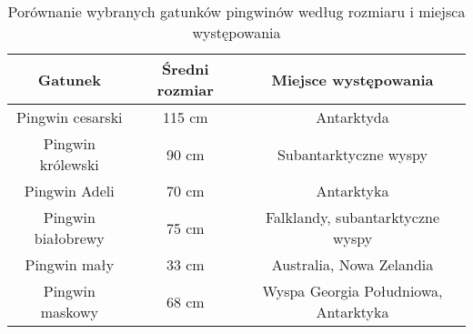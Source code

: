 
\begin{table}[h!]
    \centering
    \begin{tabular}{|c|c|c|}
        \hline
        \textbf{Gatunek} & \textbf{Średni rozmiar} & \textbf{Miejsce występowania} \\
        \hline
        Pingwin cesarski & 115 cm & Antarktyda \\
        \hline
        Pingwin królewski & 90 cm & Subantarktyczne wyspy \\
        \hline
        Pingwin Adeli & 70 cm & Antarktyka \\
        \hline
        Pingwin białobrewy & 75 cm & Falklandy, subantarktyczne wyspy \\
        \hline
        Pingwin mały & 33 cm & Australia, Nowa Zelandia \\
        \hline
        Pingwin maskowy & 68 cm & Wyspa Georgia Południowa, Antarktyka \\
        \hline
    \end{tabular}
    \caption{Porównanie wybranych gatunków pingwinów według rozmiaru i miejsca występowania}
    \label{tab:porownanie_pingwinow}
\end{table}